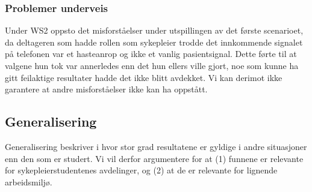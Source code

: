 \subsubsection{Problemer underveis}
Under WS2 oppsto det misforståelser under utspillingen av det første scenarioet, da deltageren som hadde rollen som sykepleier trodde det innkommende signalet på telefonen var et hasteanrop og ikke et vanlig pasientsignal. Dette førte til at valgene hun tok var annerledes enn det hun ellers ville gjort, noe som kunne ha gitt feilaktige resultater hadde det ikke blitt avdekket. Vi kan derimot ikke garantere at andre misforståelser ikke kan ha oppstått.

\subsection{Generalisering}
Generalisering beskriver i hvor stor grad resultatene er gyldige i andre situasjoner enn den som er studert. Vi vil derfor argumentere for at (1) funnene er relevante for sykepleierstudentenes avdelinger, og (2) at de er relevante for lignende arbeidsmiljø. 
